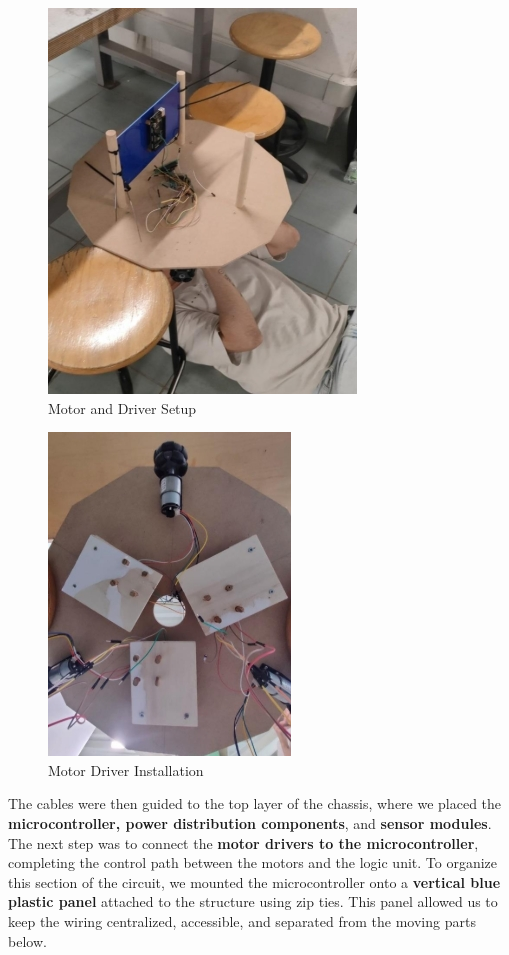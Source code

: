 \begin{figure}[H]
    \centering
    \includegraphics[width=0.6\linewidth]{../ReportMovementModule/images/Aspose.Words.728084da-df58-4b9d-a372-f65cffbdb23d.011.jpeg}
    \caption{Motor and Driver Setup}
\end{figure}

\begin{figure}[H]
    \centering
    \includegraphics[width=0.6\linewidth]{../ReportMovementModule/images/Aspose.Words.728084da-df58-4b9d-a372-f65cffbdb23d.012.jpeg}
    \caption{Motor Driver Installation}
\end{figure}

The cables were then guided to the top layer of the chassis, where we placed the \textbf{microcontroller, power distribution components}, and \textbf{sensor modules}. The next step was to connect the \textbf{motor drivers to the microcontroller}, completing the control path between the motors and the logic unit. To organize this section of the circuit, we mounted the microcontroller onto a \textbf{vertical blue plastic panel} attached to the structure using zip ties. This panel allowed us to keep the wiring centralized, accessible, and separated from the moving parts below.

